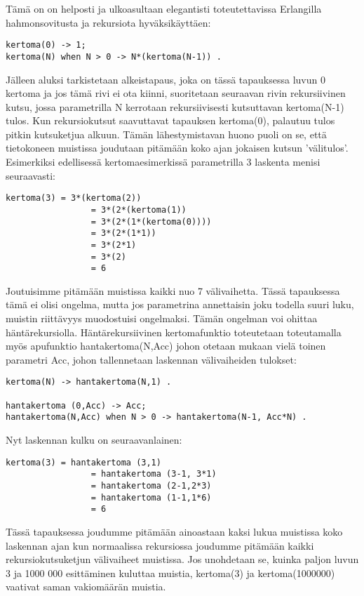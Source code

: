 \documentclass[11pt,oneside,a4paper]{article}
\begin{document}
Tämä on on helposti ja ulkoasultaan elegantisti toteutettavissa Erlangilla hahmonsovitusta ja rekursiota hyväksikäyttäen:
\begin{verbatim}
kertoma(0) -> 1;
kertoma(N) when N > 0 -> N*(kertoma(N-1)) .
\end{verbatim}
Jälleen aluksi tarkistetaan alkeistapaus, joka on tässä tapauksessa luvun 0 kertoma ja jos tämä rivi ei ota kiinni, suoritetaan seuraavan rivin rekursiivinen kutsu, jossa parametrilla N kerrotaan rekursiivisesti kutsuttavan kertoma(N-1) tulos.
Kun rekursiokutsut saavuttavat tapauksen kertoma(0), palautuu tulos pitkin kutsuketjua alkuun. Tämän lähestymistavan huono puoli on se, että tietokoneen muistissa joudutaan pitämään koko ajan jokaisen kutsun 'välitulos'. Esimerkiksi edellisessä 
kertomaesimerkissä parametrilla 3 laskenta menisi seuraavasti:
\begin{verbatim}
kertoma(3) = 3*(kertoma(2))
                 = 3*(2*(kertoma(1))
                 = 3*(2*(1*(kertoma(0))))
                 = 3*(2*(1*1))
                 = 3*(2*1)
                 = 3*(2)
                 = 6
\end{verbatim}
Joutuisimme pitämään muistissa kaikki nuo 7 välivaihetta. Tässä tapauksessa tämä ei olisi ongelma, mutta jos parametrina annettaisin joku todella suuri luku, muistin riittävyys muodostuisi ongelmaksi. 
Tämän ongelman voi ohittaa häntärekursiolla. Häntärekursiivinen kertomafunktio toteutetaan toteutamalla myös apufunktio hantakertoma(N,Acc) johon otetaan mukaan vielä toinen parametri Acc, johon tallennetaan laskennan 
välivaiheiden tulokset:
\begin{verbatim}
kertoma(N) -> hantakertoma(N,1) .

hantakertoma (0,Acc) -> Acc;
hantakertoma(N,Acc) when N > 0 -> hantakertoma(N-1, Acc*N) .
\end{verbatim}

Nyt laskennan kulku on seuraavanlainen: 
\begin{verbatim}
kertoma(3) = hantakertoma (3,1)
                 = hantakertoma (3-1, 3*1)		
                 = hantakertoma (2-1,2*3)
                 = hantakertoma (1-1,1*6)
                 = 6
\end{verbatim}
Tässä tapauksessa joudumme pitämään ainoastaan kaksi lukua muistissa koko laskennan ajan kun normaalissa rekursiossa joudumme pitämään kaikki rekursiokutsuketjun välivaiheet muistissa. Jos unohdetaan se, kuinka paljon luvun 3 ja 1000 000 esittäminen kuluttaa muistia, kertoma(3) ja kertoma(1000000) vaativat saman vakiomäärän muistia. 
\end{document}

